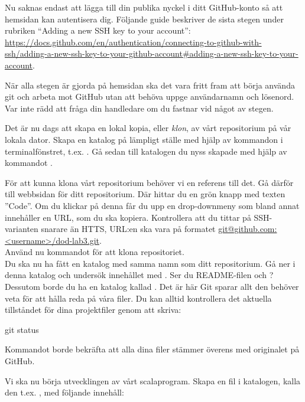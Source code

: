 \begin{Datorarbete}
	Nu saknas endast att lägga till din publika nyckel i ditt GitHub-konto så att hemsidan kan autentisera dig. Följande guide beskriver de sista stegen under rubriken ``Adding a new SSH key to your account'': \url{https://docs.github.com/en/authentication/connecting-to-github-with-ssh/adding-a-new-ssh-key-to-your-github-account#adding-a-new-ssh-key-to-your-account}.

	När alla stegen är gjorda på hemsidan ska det vara fritt fram att börja använda git och arbeta mot GitHub utan att behöva uppge användarnamn och lösenord. Var inte rädd att fråga din handledare om du fastnar vid något av stegen.

	\item Det är nu dags att skapa en lokal kopia, eller \emph{klon}, av vårt repositorium på vår lokala dator. Skapa en katalog på lämpligt ställe med hjälp av kommandon i terminalfönstret, t.ex. . Gå sedan till katalogen du nyss skapade med hjälp av kommandot .

	För att kunna klona vårt repositorium behöver vi en referens till det. Gå därför till webbsidan för ditt repositorium. Där hittar du en grön knapp med texten ''Code''. Om du klickar på denna får du upp en drop-downmeny som bland annat innehåller en URL, som du ska kopiera. Kontrollera att du tittar på SSH-varianten snarare än HTTS, URL:en ska vara på formatet \url{git@github.com:<username>/dod-lab3.git}.
	\\

	\code{[\ref{git-clone}]} Använd nu kommandot  för att klona repositoriet.
	\\

	Du ska nu ha fått en katalog med samma namn som ditt repositorium. Gå ner i denna katalog och undersök innehållet med . Ser du README-filen och ? Dessutom borde du ha en katalog kallad . Det är här Git sparar allt den behöver veta för att hålla reda på våra filer.
	Du kan alltid kontrollera det aktuella tillståndet för dina projektfiler genom att skriva:

	\begin{Code}
		git status
	\end{Code}

	Kommandot borde bekräfta att alla dina filer stämmer överens med originalet på GitHub.

	\item Vi ska nu börja utvecklingen av vårt scalaprogram. Skapa en fil i katalogen, kalla den t.ex. , med följande innehåll:


\end{Datorarbete}
